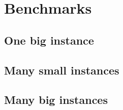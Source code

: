 \section{Benchmarks}
\subsection{One big instance}

\subsection{Many small instances}

\subsection{Many big instances}